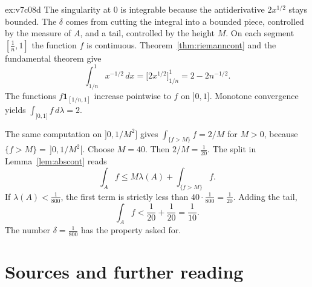 \begin{solution}{ex:v7c08d}
\idea The singularity at \(0\) is integrable because the antiderivative \(2x^{1/2}\) stays bounded. The \(\delta\) comes from cutting the integral into a bounded piece, controlled by the measure of \(A\), and a tail, controlled by the height \(M\).
\writeup On each segment \([\frac1n,1]\) the function \(f\) is continuous. Theorem~\ref{thm:riemanncont} and the fundamental theorem give
\[
\int_{1/n}^1x^{-1/2}\,dx=\bigl[2x^{1/2}\bigr]_{1/n}^1=2-2n^{-1/2}.
\]
The functions \(f\mathbf 1_{[1/n,1]}\) increase pointwise to \(f\) on \(]0,1]\). Monotone convergence yields \(\int_{]0,1]}f\,d\lambda=2\).

The same computation on \(]0,1/M^2]\) gives \(\int_{\{f>M\}}f=2/M\) for \(M>0\), because \(\{f>M\}=\,]0,1/M^2[\). Choose \(M=40\). Then \(2/M=\frac1{20}\). The split in Lemma~\ref{lem:abscont} reads
\[
\int_Af\le M\lambda(A)+\int_{\{f>M\}}f.
\]
If \(\lambda(A)<\frac1{800}\), the first term is strictly less than \(40\cdot\frac1{800}=\frac1{20}\). Adding the tail,
\[
\int_Af<\frac1{20}+\frac1{20}=\frac1{10}.
\]
The number \(\delta=\frac1{800}\) has the property asked for.
\end{solution}

\section*{Sources and further reading}

